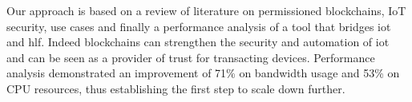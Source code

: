 Our approach is based on a review of literature on permissioned blockchains, IoT security, use cases and finally a performance analysis of a tool that bridges \acrshort{iot} and \acrlong{hlf}. Indeed blockchains can strengthen the security and automation of \acrshort{iot} and can be seen as a provider of trust for transacting devices. Performance analysis demonstrated an improvement of 71\% on bandwidth usage and 53\% on CPU resources, thus establishing the first step to scale down further.











